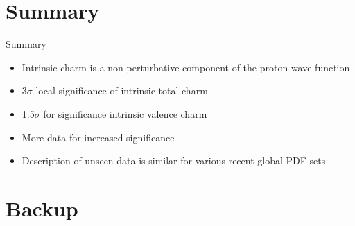 \documentclass[aspectratio=43, 8pt,t]{beamer}
\begin{document}

\section{Summary}
\begin{frame}[c]{Summary}
  \begin{itemize}
    \setlength\itemsep{1.5em} %
    \item Intrinsic charm is a non-perturbative component of the proton wave function
    \item 3$\sigma$ local significance of intrinsic total charm
    \item 1.5$\sigma$ for significance intrinsic valence charm
    \item More data for increased significance

    \vspace*{1em}
    \item Description of unseen data is similar for various recent global PDF sets
  \end{itemize}

  \vspace*{5em}
\end{frame}

\appendix
\section{Backup}


\end{document}
